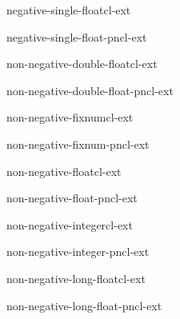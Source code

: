 \begin{type}{negative-single-float}{}{cl-ext}{}
  
\end{type}

\begin{function}{negative-single-float-p}{n}{cl-ext}{}
  
\end{function}

\begin{type}{non-negative-double-float}{}{cl-ext}{}
  
\end{type}

\begin{function}{non-negative-double-float-p}{n}{cl-ext}{}
  
\end{function}

\begin{type}{non-negative-fixnum}{}{cl-ext}{}
  
\end{type}

\begin{function}{non-negative-fixnum-p}{n}{cl-ext}{}
  
\end{function}

\begin{type}{non-negative-float}{}{cl-ext}{}
  
\end{type}

\begin{function}{non-negative-float-p}{n}{cl-ext}{}
  
\end{function}

\begin{type}{non-negative-integer}{}{cl-ext}{}
  
\end{type}

\begin{function}{non-negative-integer-p}{n}{cl-ext}{}
  
\end{function}

\begin{type}{non-negative-long-float}{}{cl-ext}{}
  
\end{type}

\begin{function}{non-negative-long-float-p}{n}{cl-ext}{}
  
\end{function}

